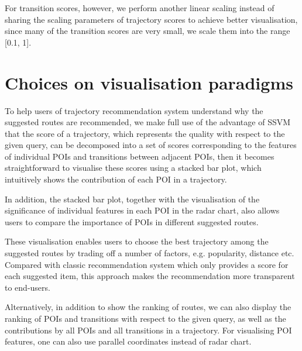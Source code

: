 \documentclass[sigconf]{acmart}
\begin{document}
For transition scores, however, 
we perform another linear scaling instead of sharing the scaling parameters of trajectory scores to achieve better visualisation,
since many of the transition scores are very small, we scale them into the range [0.1, 1].

\section{Choices on visualisation paradigms}

To help users of trajectory recommendation system understand why the suggested routes are recommended,
we make full use of the advantage of SSVM that the score of a trajectory, 
which represents the quality with respect to the given query, 
can be decomposed into a set of scores corresponding to the features of individual POIs and transitions between adjacent POIs, then it becomes straightforward to visualise these scores using a stacked bar plot,
which intuitively shows the contribution of each POI in a trajectory.

In addition, the stacked bar plot,
together with the visualisation of the significance of individual features in each POI in the radar chart,
also allows users to compare the importance of POIs in different suggested routes.

These visualisation enables users to choose the best trajectory among the suggested routes by trading off a number of factors, e.g. popularity, distance etc.
Compared with classic recommendation system which only provides a score for each suggested item, 
this approach makes the recommendation more transparent to end-users.

Alternatively, in addition to show the ranking of routes, 
we can also display the ranking of POIs and transitions with respect to the given query, 
as well as the contributions by all POIs and all transitions in a trajectory.
For visualising POI features, one can also use parallel coordinates instead of radar chart.



\end{document}
